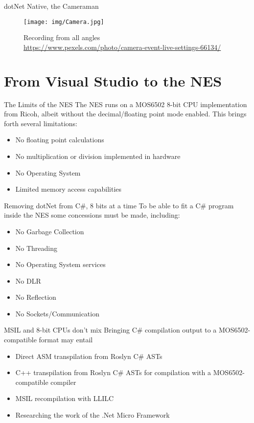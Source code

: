 \documentclass[10pt]{beamer}
\begin{document}
\begin{frame}{dotNet Native, the Cameraman}
    \begin{figure}
        \centering
        \texttt{[image: img/Camera.jpg]}
        \caption{Recording from all angles \\ \tiny{\href{Photo by Donald Tong from Pexels}{https://www.pexels.com/photo/camera-event-live-settings-66134/}}}
    \end{figure}
\end{frame}

\section{From Visual Studio to the NES}
\begin{frame}{The Limits of the NES}
The NES runs on a MOS6502 8-bit CPU implementation from Ricoh, albeit without the decimal/floating point mode enabled. This brings forth several limitations:
\begin{itemize}
    \item No floating point calculations
    \item No multiplication or division implemented in hardware
    \item No Operating System
    \item Limited memory access capabilities
\end{itemize}
\end{frame}

\begin{frame}{Removing dotNet from C\#, 8 bits at a time}
To be able to fit a C\# program inside the NES some concessions must be made, including:
\begin{itemize}
    \item No Garbage Collection
    \item No Threading
    \item No Operating System services
    \item No DLR
    \item No Reflection
    \item No Sockets/Communication
\end{itemize}
\end{frame}

\begin{frame}{MSIL and 8-bit CPUs don't mix}
Bringing C\# compilation output to a MOS6502-compatible format may entail
\begin{itemize}
    \item Direct ASM transpilation from Roslyn C\# ASTs
    \item C++ transpilation from Roslyn C\# ASTs for compilation with a MOS6502-compatible compiler
    \item MSIL recompilation with LLILC
    \item Researching the work of the .Net Micro Framework
\end{itemize}
\end{frame}
\end{document}
